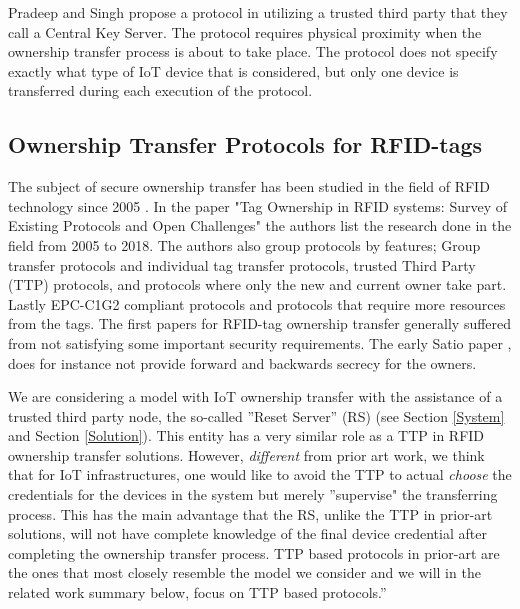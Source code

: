 {Pradeep and Singh propose a protocol in \cite{Pradeep2013} utilizing a trusted third party that they call a Central Key Server. The protocol requires physical proximity when the ownership transfer process is about to take place. The protocol does not specify exactly what type of IoT device that is considered, but only one device is transferred during each execution of the protocol.

\subsection{Ownership Transfer Protocols for RFID-tags}
The subject of secure ownership transfer has been studied in the field of RFID technology since 2005 \cite{saito2005reassignment}. In the paper "Tag Ownership in RFID systems: Survey of Existing Protocols and Open Challenges"\cite{taqieddin2018tag} the authors list the research done in the field from 2005 to 2018. The authors also group protocols by features; Group transfer protocols and individual tag transfer protocols, trusted Third Party (TTP) protocols, and protocols where only the new and current owner take part. Lastly EPC-C1G2 \cite{epc-c1g2} compliant protocols and protocols that require more resources from the tags. The first papers for RFID-tag ownership transfer generally suffered from not satisfying some important security requirements. The early Satio paper \cite{saito2005reassignment}, does for instance not provide forward and backwards secrecy for the owners. 

We are considering a model with IoT ownership transfer with the assistance of a trusted third party node, the so-called ''Reset Server'' (RS) (see Section \ref{System} and Section \ref{Solution}). This entity has a very similar role as a TTP in RFID ownership transfer solutions. However, {\em different} from prior art work, we think that for IoT infrastructures, one would like to avoid the TTP to actual {\em choose} the credentials for the devices in the system but merely ''supervise" the transferring process. This has the main advantage that the RS, unlike the TTP in prior-art solutions, will not have complete knowledge of the final device credential after completing the ownership transfer process. TTP based protocols in prior-art are the ones that most closely resemble the model we consider and we will in the related work summary below, focus on TTP based protocols.” 

}
